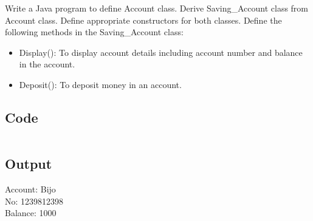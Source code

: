 \documentclass[../main.tex]{subfiles}
\begin{document}
Write a Java program to define Account class. Derive Saving\_Account class from
Account class. Define appropriate constructors for both classes. Define the
following methods in the Saving\_Account class:
\begin{itemize}
	\item Display(): To display account details including account number and
	      balance in the account.
	\item Deposit(): To deposit money in an account.
\end{itemize}

\subsection{Code}
\inputminted[frame=lines, breaklines, breakanywhere, numberblanklines=false]{java}{./programs/prog15/SavingsAccount.java}

\subsection{Output}
Account: Bijo \\
No: 1239812398 \\
Balance: 1000 \\
\end{document}
